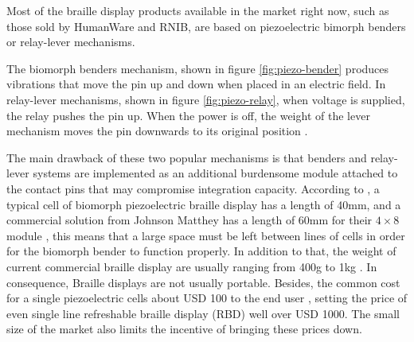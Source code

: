 Most of the braille display products available in the market right now, such as those sold by HumanWare and RNIB, are based on piezoelectric bimorph benders or relay-lever mechanisms.  

The biomorph benders mechanism, shown in figure \ref{fig:piezo-bender} produces vibrations that move the pin up and down when placed in an electric field.
In relay-lever mechanisms, shown in figure \ref{fig:piezo-relay}, when voltage is supplied, the relay pushes the pin up. When the power is off, the weight of the lever mechanism moves the pin downwards to its original position \cite{hernandez_characterization_2009}.

The main drawback of these two popular mechanisms is that benders and relay-lever systems are implemented as an additional burdensome module attached to the contact pins that may compromise integration capacity. According to 
\cite{di_bucchianico_survey_2018}, a typical cell of biomorph piezoelectric braille display has a length of 40mm, and a commercial solution from Johnson Matthey has a length of 60mm for their $4 \times 8$ module \cite{JM_braille_display}, this means that a large space must be left between lines of cells in order for the biomorph bender to function properly. In addition to that, the weight of current commercial braille display are usually ranging from 400g to 1kg \cite{Humanware_BrailleNote} \cite{Brailliant_BI_40X}.
In consequence, Braille displays are not usually portable. Besides, the common cost for a single piezoelectric cells about USD 100 to the end user \cite{runyan_eap_2010}, setting the price of even single line refreshable braille display (RBD) well over USD 1000. The small size of the market also limits the incentive of bringing these prices down.

